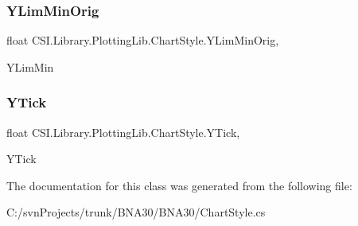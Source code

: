 \subsubsection{\texorpdfstring{YLimMinOrig}{YLimMinOrig}}
{\footnotesize\ttfamily float C\+S\+I.\+Library.\+Plotting\+Lib.\+Chart\+Style.\+Y\+Lim\+Min\+Orig\hspace{0.3cm}{\ttfamily [get]}, {\ttfamily [set]}}



Y\+Lim\+Min 

\mbox{\label{class_c_s_i_1_1_library_1_1_plotting_lib_1_1_chart_style_a3f11da20564ccd605f5c26d4fd1eab61}} 
\subsubsection{\texorpdfstring{YTick}{YTick}}
{\footnotesize\ttfamily float C\+S\+I.\+Library.\+Plotting\+Lib.\+Chart\+Style.\+Y\+Tick\hspace{0.3cm}{\ttfamily [get]}, {\ttfamily [set]}}



Y\+Tick 



The documentation for this class was generated from the following file\+:\begin{DoxyCompactItemize}
\item 
C\+:/svn\+Projects/trunk/\+B\+N\+A30/\+B\+N\+A30/Chart\+Style.\+cs\end{DoxyCompactItemize}
